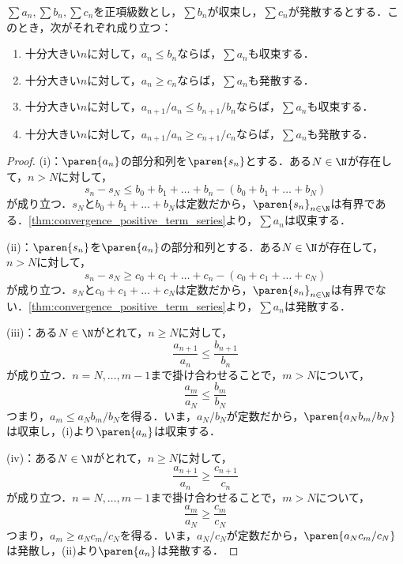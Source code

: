 \documentclass[a4paper,10pt]{ltjsarticle}
\begin{document}
\begin{MyTheorem}
  \(\sum a_n, \sum b_n, \sum c_n\)を正項級数とし，\(\sum b_n\)が収束し，\(\sum c_n\)が発散するとする．このとき，次がそれぞれ成り立つ：
  \begin{enumerate}
    \item 十分大きい\(n\)に対して，\(a_n \le b_n\)ならば，\(\sum a_n\)も収束する．
    \item 十分大きい\(n\)に対して，\(a_n \ge c_n\)ならば，\(\sum a_n\)も発散する．
    \item 十分大きい\(n\)に対して，\(a_{n+1}/a_n \le b_{n+1}/b_n\)ならば，\(\sum a_n\)も収束する．
    \item 十分大きい\(n\)に対して，\(a_{n+1}/a_n \ge c_{n+1}/c_n\)ならば，\(\sum a_n\)も発散する．
  \end{enumerate}
\end{MyTheorem}
\begin{proof}
  (i)：\(\paren{a_n}\)の部分和列を\(\paren{s_n}\)とする．ある\(N \in \N\)が存在して，\(n > N\)に対して，
  \[ s_n - s_N \le b_0 + b_1 + \dots + b_n - (b_0 + b_1 + \dots + b_N) \]
  が成り立つ．\(s_N\)と\(b_0 + b_1 + \dots + b_N\)は定数だから，\(\paren{s_n}_{n\in\N}\)は有界である．\cref{thm:convergence_positive_term_series}より，\(\sum a_n\)は収束する．

  (ii)：\(\paren{s_n}\)を\(\paren{a_n}\)の部分和列とする．ある\(N \in \N\)が存在して，\(n > N\)に対して，
  \[ s_n - s_N \ge c_0 + c_1 + \dots + c_n - (c_0 + c_1 + \dots + c_N) \]
  が成り立つ．\(s_N\)と\(c_0 + c_1 + \dots + c_N\)は定数だから，\(\paren{s_n}_{n\in\N}\)は有界でない．\cref{thm:convergence_positive_term_series}より，\(\sum a_n\)は発散する．

  (iii)：ある\(N \in \N\)がとれて，\(n \ge N\)に対して，
  \[ \frac{a_{n+1}}{a_n} \le \frac{b_{n+1}}{b_n} \]
  が成り立つ．\(n = N, \dots, m-1\)まで掛け合わせることで，\(m > N\)について，
  \[ \frac{a_m}{a_N} \le \frac{b_m}{b_N} \]
  つまり，\(a_m \le a_Nb_m/b_N\)を得る．いま，\(a_N/b_N\)が定数だから，\(\paren{a_Nb_m/b_N}\)は収束し，(i)より\(\paren{a_n}\)は収束する．

  (iv)：ある\(N \in \N\)がとれて，\(n \ge N\)に対して，
  \[ \frac{a_{n+1}}{a_n} \ge \frac{c_{n+1}}{c_n} \]
  が成り立つ．\(n = N, \dots, m-1\)まで掛け合わせることで，\(m > N\)について，
  \[ \frac{a_m}{a_N} \ge \frac{c_m}{c_N} \]
  つまり，\(a_m \ge a_Nc_m/c_N\)を得る．いま，\(a_N/c_N\)が定数だから，\(\paren{a_Nc_m/c_N}\)は発散し，(ii)より\(\paren{a_n}\)は発散する．
\end{proof}
\end{document}
